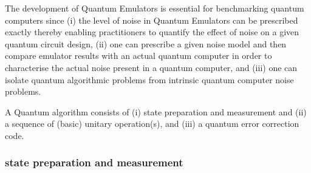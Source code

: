 \documentclass[a4paper,fleqn]{cas-sc}
\begin{document}
The development of Quantum Emulators is essential for benchmarking quantum 
computers since (i) the level of noise in Quantum Emulators can be 
prescribed exactly thereby enabling practitioners to quantify the effect of 
noise on a given quantum circuit design, (ii)
one can prescribe a given noise model\cite{PhysRevA.107.062406} and then
compare emulator results with an actual quantum computer in order to 
characterise the actual noise present in a quantum computer, and
(iii) one can isolate quantum algorithmic problems from intrinsic
quantum computer noise problems.

A Quantum algorithm consists of (i) state preparation and measurement 
and (ii) a sequence of (basic) unitary operation(s), and (iii) a quantum
error correction code.

\subsubsection{state preparation and measurement}
\end{document}
